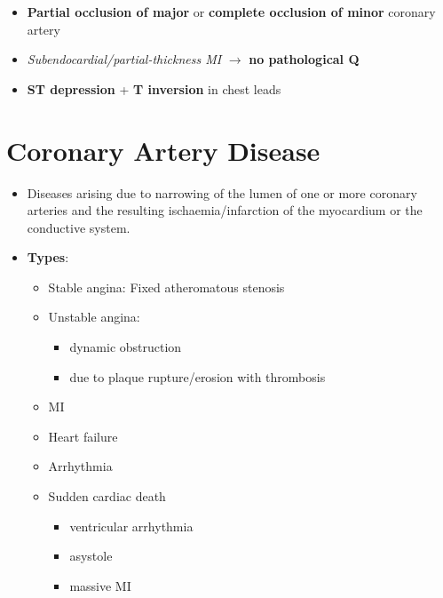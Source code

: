 \documentclass[
  12pt,
]{memoir}
\providecommand{\tightlist}{%
  \setlength{\itemsep}{0pt}\setlength{\parskip}{0pt}}
\begin{document}
\begin{itemize}
\tightlist
\item
  \textbf{Partial occlusion of major} or \textbf{complete occlusion of
  minor} coronary artery
\item
  \emph{Subendocardial/partial-thickness MI} \(\rightarrow\) \textbf{no
  pathological Q}
\item
  \textbf{ST depression} + \textbf{T inversion} in chest leads
\end{itemize}

\hypertarget{coronary-artery-disease}{%
\section{Coronary Artery Disease}\label{coronary-artery-disease}}

\begin{itemize}
\tightlist
\item
  Diseases arising due to narrowing of the lumen of one or more coronary
  arteries and the resulting ischaemia/infarction of the myocardium or
  the conductive system.
\item
  \textbf{Types}:

  \begin{itemize}
  \tightlist
  \item
    Stable angina: Fixed atheromatous stenosis
  \item
    Unstable angina:

    \begin{itemize}
    \tightlist
    \item
      dynamic obstruction
    \item
      due to plaque rupture/erosion with thrombosis
    \end{itemize}
  \item
    MI
  \item
    Heart failure
  \item
    Arrhythmia
  \item
    Sudden cardiac death

    \begin{itemize}
    \tightlist
    \item
      ventricular arrhythmia
    \item
      asystole
    \item
      massive MI
    \end{itemize}
  \end{itemize}
\end{itemize}
\end{document}
